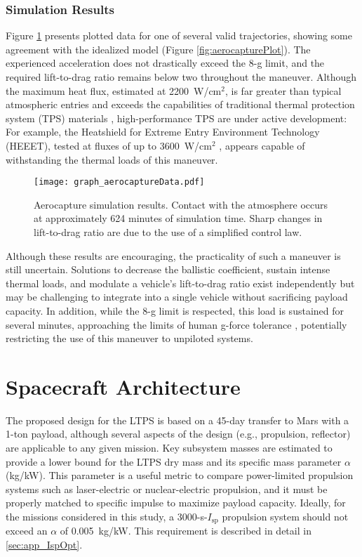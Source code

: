 \documentclass[final,3p,times,twocolumn,sort&compress, lefttitle]{elsarticle}
\begin{document}
            \subsubsection{Simulation Results}
                Figure \ref{fig:aerocaptureData} presents plotted data for one of several valid trajectories, showing some agreement with the idealized model (Figure \ref{fig:aerocapturePlot}). The experienced acceleration does not drastically exceed the 8-g limit, and the required lift-to-drag ratio remains below two throughout the maneuver. Although the maximum heat flux, estimated at 2200~W/cm$^2$, is far greater than typical atmospheric entries \cite{wright_mars_2006} and exceeds the capabilities of traditional thermal protection system (TPS) materials \cite{lu_titan_2020}, high-performance TPS are under active development: For example, the Heatshield for Extreme Entry Environment Technology (HEEET), tested at fluxes of up to 3600~W/cm$^2$ \cite{ellerby_heatshield_2019}, appears capable of withstanding the thermal loads of this maneuver.
                
                \begin{figure}[h]
                    \centering
                    \texttt{[image: graph\_aerocaptureData.pdf]}
                    \caption{Aerocapture simulation results. Contact with the atmosphere occurs at approximately 624 minutes of simulation time. Sharp changes in lift-to-drag ratio are due to the use of a simplified control law.}
                    \label{fig:aerocaptureData}
                \end{figure}
                
                Although these results are encouraging, the practicality of such a maneuver is still uncertain. Solutions to decrease the ballistic coefficient, sustain intense thermal loads, and modulate a vehicle's lift-to-drag ratio exist independently but may be challenging to integrate into a single vehicle without sacrificing payload capacity. In addition, while the 8-g limit is respected, this load is sustained for several minutes, approaching the limits of human g-force tolerance \cite{creer_centrifuge_1960}, potentially restricting the use of this maneuver to unpiloted systems.
            
    
    \section{Spacecraft Architecture}
        The proposed design for the LTPS is based on a 45-day transfer to Mars with a 1-ton payload, although several aspects of the design (e.g., propulsion, reflector) are applicable to any given mission. Key subsystem masses are estimated to provide a lower bound for the LTPS dry mass and its specific mass parameter $\alpha$ (kg/kW). This parameter is a useful metric to compare power-limited propulsion systems such as laser-electric or nuclear-electric propulsion, and it must be properly matched to specific impulse to maximize payload capacity. Ideally, for the missions considered in this study, a 3000-s-$I_\mathrm{sp}$ propulsion system should not exceed an $\alpha$ of 0.005~kg/kW. This requirement is described in detail in \ref{sec:app_IspOpt}.
        
\end{document}

